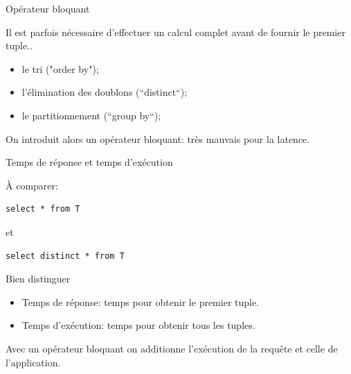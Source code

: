 \begin{frame}{Opérateur bloquant}

Il est parfois nécessaire d'effectuer un calcul \alert{complet}
avant de fournir le premier tuple..

\vfill

\begin{itemize}
    \item le tri ("order by");
     \item l'élimination des doublons (``distinct``);
       \item le partitionnement (``group by``);
\end{itemize}

\vfill

On introduit alors un opérateur \alert{bloquant}: très mauvais pour la latence.
\end{frame}


\begin{frame}[fragile]{Temps de réponse et temps d'exécution}

À comparer:


\begin{verbatim}
select * from T
\end{verbatim}

et 
\begin{verbatim}
select distinct * from T
\end{verbatim}
      
\vfill

Bien distinguer

\begin{itemize}
  \item \alert{Temps de réponse}: temps pour obtenir le premier tuple.
  \item \alert{Temps d'exécution}: temps pour obtenir tous les tuples.  
\end{itemize}

\vfill

Avec un opérateur bloquant on \alert{additionne} l'exécution de la requête et celle de l'application.

\end{frame}


